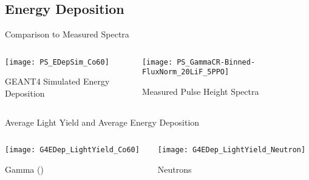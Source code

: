 \documentclass[compress]{beamer}
\begin{document}
\subsection{Energy Deposition}
\begin{frame}{Comparison to Measured Spectra}
  \begin{columns}
    \begin{column}{0.45\textwidth}
      \centering
      \texttt{[image: PS\_EDepSim\_Co60]}

     GEANT4 Simulated Energy Deposition
    \end{column}
    \begin{column}{0.45\textwidth}
      \centering
      \texttt{[image: PS\_GammaCR-Binned-FluxNorm\_20LiF\_5PPO]}

      Measured Pulse Height Spectra
    \end{column}
  \end{columns}
\end{frame}
\begin{frame}{Average Light Yield and Average Energy Deposition}
  \begin{columns}
    \begin{column}{0.45\textwidth}
      \centering
      \texttt{[image: G4EDep\_LightYield\_Co60]}

		  Gamma ()
    \end{column}
    \begin{column}{0.45\textwidth}
      \centering
      \texttt{[image: G4EDep\_LightYield\_Neutron]}

		  Neutrons
    \end{column}
  \end{columns}
\end{frame}
\end{document}
